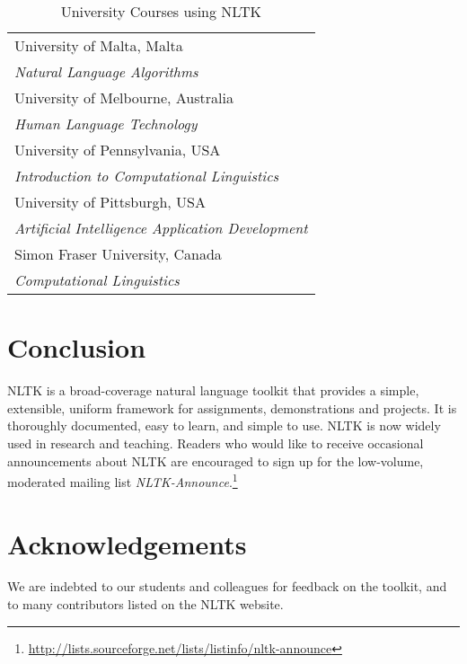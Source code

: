 \documentclass[11pt]{article}
\begin{document}
\begin{table}[bt]
\begin{boxedminipage}{\linewidth}
\begin{tabular}{l}
University of Malta, Malta \\
\hspace{2ex}
\textit{Natural Language Algorithms}\\[.5ex]

University of Melbourne, Australia \\
\hspace{2ex}
\textit{Human Language Technology} \\[.5ex]

University of Pennsylvania, USA \\
\hspace{2ex}
\textit{Introduction to Computational Linguistics} \\[.5ex]

University of Pittsburgh, USA \\
\hspace{2ex}
\textit{Artificial Intelligence Application Development} \\[.5ex]

Simon Fraser University, Canada \\
\hspace{2ex}
\textit{Computational Linguistics} \\[.5ex]

\end{tabular}
\caption{University Courses using NLTK}\label{tab:courses}
\end{boxedminipage}
\end{table}

\section{Conclusion}

NLTK is a broad-coverage natural language toolkit that provides a simple, extensible,
uniform framework for assignments, demonstrations and projects.  It is
thoroughly documented, easy to learn, and simple to use.  NLTK is now widely
used in research and teaching.  Readers who
would like to receive occasional announcements about NLTK are
encouraged to sign up for the low-volume, moderated mailing list
\textit{NLTK-Announce}.\footnote{\url{http://lists.sourceforge.net/lists/listinfo/nltk-announce}}

\section{Acknowledgements}

We are indebted to our students and colleagues for feedback on the
toolkit, and to many contributors listed on the NLTK website.

\pagebreak



\end{document}
